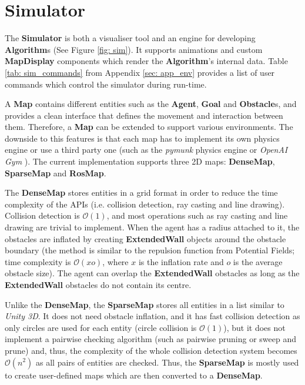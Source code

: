 \section{Simulator}

The \textbf{Simulator} is both a visualiser tool and an engine for developing \textbf{Algorithm}s (See Figure \ref{fig: sim}). It supports animations and custom \textbf{MapDisplay} components which render the \textbf{Algorithm}'s internal data. Table \ref{tab: sim_commands} from Appendix \ref{sec: app_env} provides a list of user commands which control the simulator during run-time.

A \textbf{Map} contains different entities such as the \textbf{Agent}, \textbf{Goal} and \textbf{Obstacle}s, and provides a clean interface that defines the movement and interaction between them. Therefore, a \textbf{Map} can be extended to support various environments. The downside to this features is that each map has to implement its own physics engine or use a third party one (such as the \textit{pymunk} physics engine \cite{pymunk} or \textit{OpenAI Gym} \cite{OpenAI_Gym}). The current implementation supports three 2D maps: \textbf{DenseMap}, \textbf{SparseMap} and \textbf{RosMap}. 

The \textbf{DenseMap} stores entities in a grid format in order to reduce the time complexity of the APIs (i.e. collision detection, ray casting and line drawing). Collision detection is $\mathcal{O}(1)$, and most operations such as ray casting and line drawing are trivial to implement. When the agent has a radius attached to it, the obstacles are inflated by creating \textbf{ExtendedWall} objects around the obstacle boundary (the method is similar to the repulsion function from Potential Fields; time complexity is $\mathcal{O}(xo)$, where $x$ is the inflation rate and $o$ is the average obstacle size). The agent can overlap the \textbf{ExtendedWall} obstacles as long as the \textbf{ExtendedWall} obstacles do not contain its centre. 

Unlike the \textbf{DenseMap}, the \textbf{SparseMap} stores all entities in a list similar to \textit{Unity 3D}. It does not need obstacle inflation, and it has fast collision detection as only circles are used for each entity (circle collision is $\mathcal{O}(1)$), but it does not implement a pairwise checking algorithm (such as pairwise pruning or sweep and prune) and, thus, the complexity of the whole collision detection system becomes $\mathcal{O}(n^2)$ as all pairs of entities are checked. Thus, the \textbf{SparseMap} is mostly used to create user-defined maps which are then converted to a \textbf{DenseMap}.

